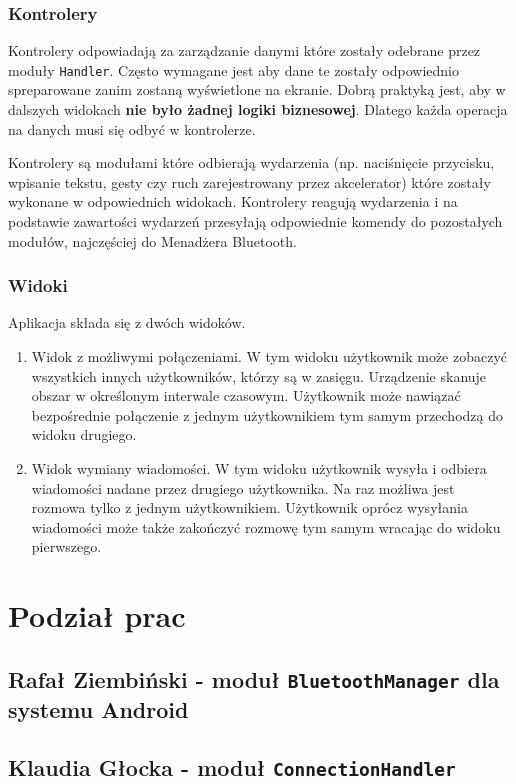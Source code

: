 \documentclass[a4paper, titlepage]{article}
\begin{document}
\subsubsection{Kontrolery}
\label{sec:orgdfd7432}
Kontrolery odpowiadają za zarządzanie danymi które zostały odebrane przez moduły \texttt{Handler}.
Często wymagane jest aby dane te zostały odpowiednio spreparowane zanim zostaną wyświetlone na ekranie.
Dobrą praktyką jest, aby w dalszych widokach \textbf{nie było żadnej logiki biznesowej}. Dlatego każda operacja na danych musi się odbyć w kontrolerze.

Kontrolery są modułami które odbierają wydarzenia (np. naciśnięcie przycisku, wpisanie tekstu, gesty czy ruch zarejestrowany przez akcelerator) które zostały wykonane w odpowiednich widokach.
Kontrolery reagują wydarzenia i na podstawie zawartości wydarzeń przesyłają odpowiednie komendy do pozostałych modułów, najczęściej do Menadżera Bluetooth.
\subsubsection{Widoki}
\label{sec:orgc26f2e5}
Aplikacja składa się z dwóch widoków.
\begin{enumerate}
\item Widok z możliwymi połączeniami. 
W tym widoku użytkownik może zobaczyć wszystkich innych użytkowników, którzy są w zasięgu.
Urządzenie skanuje obszar w określonym interwale czasowym.
Użytkownik może nawiązać bezpośrednie połączenie z jednym użytkownikiem tym samym przechodzą do widoku drugiego.
\item Widok wymiany wiadomości.
W tym widoku użytkownik wysyła i odbiera wiadomości nadane przez drugiego użytkownika. Na raz możliwa jest rozmowa tylko z jednym użytkownikiem.
Użytkownik oprócz wysyłania wiadomości może także zakończyć rozmowę tym samym wracając do widoku pierwszego.
\end{enumerate}
\section{Podział prac}
\label{sec:org0da3699}
\subsection{Rafał Ziembiński - moduł \texttt{BluetoothManager} dla systemu Android}
\label{sec:org561f1e1}
\subsection{Klaudia Głocka - moduł \texttt{ConnectionHandler}}
\label{sec:org0502abe}
\end{document}
